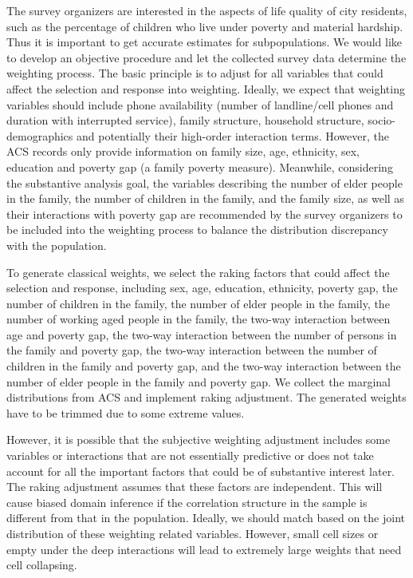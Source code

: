 \documentclass[11pt]{article}
\numberwithin{figure}{section}
\numberwithin{table}{section}
\numberwithin{equation}{section}
\begin{document}
The survey organizers are interested in the aspects of life quality of city
residents, such as the percentage of children who live under poverty and
material hardship. Thus it is important to get accurate estimates for
subpopulations. We would like to develop an objective procedure and let the
collected survey data determine the weighting process. The basic principle is
to adjust for all variables that could affect the selection and response into
weighting. Ideally, we expect that weighting variables should include phone
availability (number of landline/cell phones and duration with interrupted
service), family structure, household structure, socio-demographics and
potentially their high-order interaction terms. However, the ACS records only
provide information on family size, age, ethnicity, sex, education and poverty
gap (a family poverty measure). Meanwhile, considering the substantive analysis
goal, the variables describing the number of elder people in the family, the
number of children in the family, and the family size, as well as their
interactions with poverty gap are recommended by the survey organizers to be
included into the weighting process to balance the distribution discrepancy
with the population. 
	
To generate classical weights, we select the raking factors that could affect
the selection and response, including sex, age, education, ethnicity, poverty
gap, the number of children in the family, the number of elder people in the
family, the number of working aged people in the family, the two-way
interaction between age and poverty gap, the two-way interaction between the
number of persons in the family and poverty gap, the two-way interaction
between the number of children in the family and poverty gap, and the two-way
interaction between the number of elder people in the family and poverty gap.
We collect the marginal distributions from ACS and implement raking adjustment.
The generated weights have to be trimmed due to some extreme values.
		
However, it is possible that the subjective weighting adjustment includes some
variables or interactions that are not essentially predictive or does not take
account for all the important factors that could be of substantive interest
later. The raking adjustment assumes that these factors are independent. This
will cause biased domain inference if the correlation structure in the sample
is different from that in the population. Ideally, we should match based on the
joint distribution of these weighting related variables. However, small cell
sizes or empty under the deep interactions will lead to extremely large weights
that need cell collapsing. 
	
\end{document}

